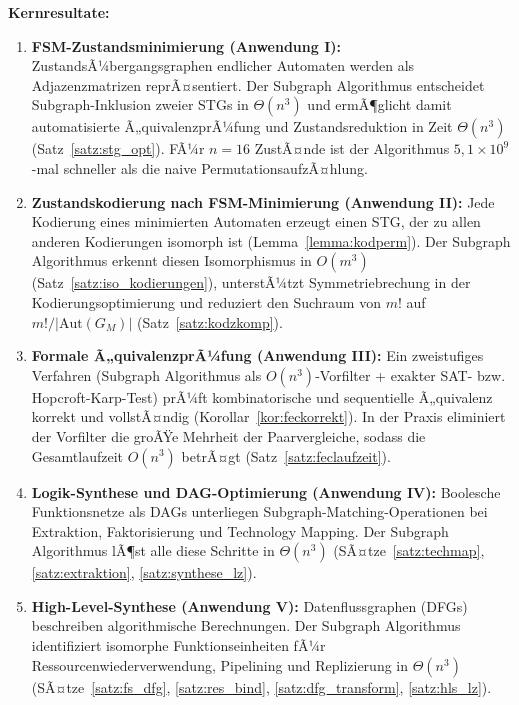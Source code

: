 ﻿\documentclass[a4paper,12pt]{article}
\theoremstyle{definition}
\begin{document}
\textbf{Kernresultate:}
\begin{enumerate}
  \item \textbf{FSM-Zustandsminimierung (Anwendung I):} ZustandsÃ¼bergangsgraphen
        endlicher Automaten werden als Adjazenzmatrizen reprÃ¤sentiert. Der Subgraph
        Algorithmus entscheidet Subgraph-Inklusion zweier STGs in $\Theta(n^3)$ und
        ermÃ¶glicht damit automatisierte Ã„quivalenzprÃ¼fung und Zustandsreduktion in
        Zeit $\Theta(n^3)$ (Satz~\ref{satz:stg_opt}). FÃ¼r $n = 16$ ZustÃ¤nde ist der
        Algorithmus $5{,}1 \times 10^9$-mal schneller als die naive PermutationsaufzÃ¤hlung.

  \item \textbf{Zustandskodierung nach FSM-Minimierung (Anwendung II):} Jede
        Kodierung eines minimierten Automaten erzeugt einen STG, der zu allen anderen
        Kodierungen isomorph ist (Lemma~\ref{lemma:kodperm}). Der Subgraph Algorithmus
        erkennt diesen Isomorphismus in $O(m^3)$ (Satz~\ref{satz:iso_kodierungen}),
        unterstÃ¼tzt Symmetriebrechung in der Kodierungsoptimierung und reduziert den
        Suchraum von $m!$ auf $m!/|\text{Aut}(G_M)|$ (Satz~\ref{satz:kodzkomp}).

  \item \textbf{Formale Ã„quivalenzprÃ¼fung (Anwendung III):} Ein zweistufiges Verfahren
        (Subgraph Algorithmus als $O(n^3)$-Vorfilter + exakter SAT- bzw.
        Hopcroft-Karp-Test) prÃ¼ft kombinatorische und sequentielle Ã„quivalenz korrekt
        und vollstÃ¤ndig (Korollar~\ref{kor:feckorrekt}). In der Praxis eliminiert der
        Vorfilter die groÃŸe Mehrheit der Paarvergleiche, sodass die Gesamtlaufzeit
        $O(n^3)$ betrÃ¤gt (Satz~\ref{satz:feclaufzeit}).

  \item \textbf{Logik-Synthese und DAG-Optimierung (Anwendung IV):} Boolesche
        Funktionsnetze als DAGs unterliegen Subgraph-Matching-Operationen bei
        Extraktion, Faktorisierung und Technology Mapping. Der Subgraph Algorithmus
        lÃ¶st alle diese Schritte in $\Theta(n^3)$ (SÃ¤tze~\ref{satz:techmap},
        \ref{satz:extraktion}, \ref{satz:synthese_lz}).

  \item \textbf{High-Level-Synthese (Anwendung V):} Datenflussgraphen (DFGs)
        beschreiben algorithmische Berechnungen. Der Subgraph Algorithmus identifiziert
        isomorphe Funktionseinheiten fÃ¼r Ressourcenwiederverwendung, Pipelining und
        Replizierung in $\Theta(n^3)$ (SÃ¤tze~\ref{satz:fs_dfg}, \ref{satz:res_bind},
        \ref{satz:dfg_transform}, \ref{satz:hls_lz}).


\end{enumerate}
\end{document}
